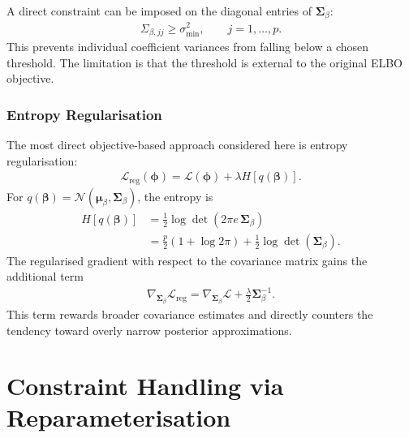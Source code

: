 \documentclass[11pt,a4paper]{article}
\newcommand{\N}{\mathcal{N}}
\begin{document}
A direct constraint can be imposed on the diagonal entries of $\bm{\Sigma}_\beta$:
\begin{align}
\Sigma_{\beta,jj} \geq \sigma^2_{\min}, \qquad j=1,\ldots,p.
\end{align}
This prevents individual coefficient variances from falling below a chosen threshold. The limitation is that the threshold is external to the original ELBO objective.

\subsubsection{Entropy Regularisation}

The most direct objective-based approach considered here is entropy regularisation:
\begin{align}
\mathcal{L}_{\mathrm{reg}}(\bm{\phi})
= \mathcal{L}(\bm{\phi}) + \lambda H[q(\bm{\beta})].
\end{align}
For $q(\bm{\beta})=\N(\bm{\mu}_\beta,\bm{\Sigma}_\beta)$, the entropy is
\begin{align}
H[q(\bm{\beta})]
&= \frac{1}{2}\log\det(2\pi e\,\bm{\Sigma}_\beta)\\
&= \frac{p}{2}(1+\log 2\pi) + \frac{1}{2}\log\det(\bm{\Sigma}_\beta).
\end{align}
The regularised gradient with respect to the covariance matrix gains the additional term
\begin{align}
\nabla_{\bm{\Sigma}_\beta}\mathcal{L}_{\mathrm{reg}}
= \nabla_{\bm{\Sigma}_\beta}\mathcal{L}
+ \frac{\lambda}{2}\bm{\Sigma}_\beta^{-1}.
\end{align}
This term rewards broader covariance estimates and directly counters the tendency toward overly narrow posterior approximations.
\section{Constraint Handling via Reparameterisation}
\end{document}

